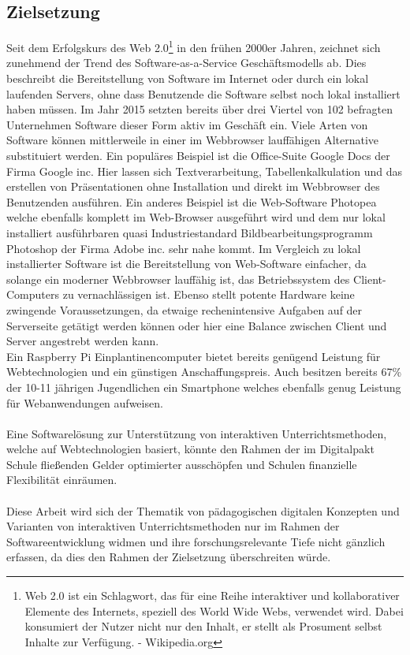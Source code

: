 \subsection{Zielsetzung}\label{sec:zielsetzung}
Seit dem Erfolgskurs des Web 2.0\footnote{Web 2.0 ist ein Schlagwort, das für eine Reihe interaktiver und kollaborativer Elemente des Internets, speziell des World Wide Webs, verwendet wird. Dabei konsumiert der Nutzer nicht nur den Inhalt, er stellt als Prosument selbst Inhalte zur Verfügung. - Wikipedia.org} in den frühen 2000er Jahren, zeichnet sich zunehmend der Trend des Software-as-a-Service Geschäftsmodells ab. Dies beschreibt die Bereitstellung von Software im Internet oder durch ein lokal laufenden Servers, ohne dass Benutzende die Software selbst noch lokal installiert haben müssen. Im Jahr 2015 setzten bereits über drei Viertel von 102 befragten Unternehmen Software dieser Form aktiv im Geschäft ein\cite{TecArt-GmbH2019:online}. Viele Arten von Software können  mittlerweile in einer im Webbrowser lauffähigen Alternative substituiert werden. Ein populäres Beispiel ist die Office-Suite Google Docs der Firma Google inc. Hier lassen sich Textverarbeitung, Tabellenkalkulation und das erstellen von Präsentationen ohne Installation und direkt im Webbrowser des Benutzenden ausführen. Ein anderes Beispiel ist die Web-Software Photopea welche ebenfalls komplett im Web-Browser ausgeführt wird und dem nur lokal installiert ausführbaren quasi Industriestandard Bildbearbeitungsprogramm Photoshop der Firma Adobe inc. sehr nahe kommt. Im Vergleich zu lokal installierter Software ist die Bereitstellung von Web-Software einfacher, da solange ein moderner Webbrowser lauffähig ist, das Betriebssystem des Client-Computers zu vernachlässigen ist. Ebenso stellt potente Hardware keine zwingende Voraussetzungen, da etwaige rechenintensive Aufgaben auf der Serverseite getätigt werden können oder hier eine Balance zwischen Client und Server angestrebt werden kann. \\ 
Ein Raspberry Pi Einplantinencomputer bietet bereits genügend Leistung für Webtechnologien und ein günstigen Anschaffungspreis. Auch besitzen bereits 67\% der 10-11 jährigen Jugendlichen ein Smartphone \cite{Statista2017:online} welches ebenfalls genug Leistung für Webanwendungen aufweisen. \\ \\ Eine Softwarelösung zur Unterstützung von interaktiven Unterrichtsmethoden, welche auf Webtechnologien basiert, könnte den Rahmen der im Digitalpakt Schule fließenden Gelder optimierter ausschöpfen und Schulen finanzielle Flexibilität einräumen. 
\\ \\
Diese Arbeit wird sich der Thematik von pädagogischen digitalen Konzepten und Varianten von interaktiven Unterrichtsmethoden nur im Rahmen der Softwareentwicklung widmen und ihre forschungsrelevante Tiefe nicht gänzlich erfassen, da dies den Rahmen der Zielsetzung überschreiten würde.
\newpage


   
